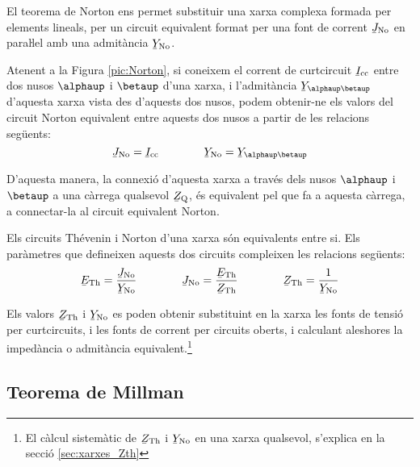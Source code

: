 El teorema de Norton ens permet substituir
una xarxa complexa formada per elements lineals, per un circuit
equivalent format per una font de corrent $\cmplx{J}\ped{No}$ en
paraŀlel amb una admitància $\cmplx{Y}\ped{No}$.

Atenent a la Figura \vref{pic:Norton}, si coneixem el corrent de
curtcircuit $\cmplx{I}\ped{cc}$ entre dos nusos $\alphaup$ i $\betaup$
d'una xarxa, i l'admitància $\cmplx{Y}_{\alphaup\betaup}$ d'aquesta
xarxa vista des d'aquests dos nusos, podem obtenir-ne els valors del
circuit Norton equivalent entre aquests dos nusos a partir de les
relacions següents:
\begin{equation}
   \cmplx{J}\ped{No} = \cmplx{I}\ped{cc} \qquad\qquad \cmplx{Y}\ped{No} = \cmplx{Y}_{\alphaup\betaup}
\end{equation}

D'aquesta manera, la connexió d'aquesta xarxa a través dels nusos
$\alphaup$ i $\betaup$ a una càrrega qualsevol $\cmplx{Z}\ped{Q}$, és
equivalent pel que fa a aquesta càrrega, a connectar-la al circuit
equivalent Norton.
\begin{center}
    
    \label{pic:Norton}
\end{center}

Els circuits Thévenin i Norton d'una xarxa són equivalents entre si.
Els paràmetres que defineixen aquests dos circuits compleixen les relacions
següents:
\begin{equation}\label{eq:Thevenin-Norton}
   \cmplx{E}\ped{Th} = \frac{\cmplx{J}\ped{No}}{\cmplx{Y}\ped{No}} \qquad\qquad
   \cmplx{J}\ped{No} = \frac{\cmplx{E}\ped{Th}}{\cmplx{Z}\ped{Th}} \qquad\qquad
    \cmplx{Z}\ped{Th} = \frac{1}{\cmplx{Y}\ped{No}}
\end{equation}

Els valors $\cmplx{Z}\ped{Th}$ i  $\cmplx{Y}\ped{No}$ es poden
obtenir substituint en la xarxa  les fonts de tensió  per curtcircuits, i les fonts de corrent per circuits oberts, i calculant
aleshores la impedància o admitància equivalent.\footnote{El càlcul sistemàtic de $\cmplx{Z}\ped{Th}$ i  $\cmplx{Y}\ped{No}$ en una xarxa qualsevol, s'explica en la secció \ref{sec:xarxes_Zth}}

\subsection{Teorema de Millman}\label{sec:millman}

